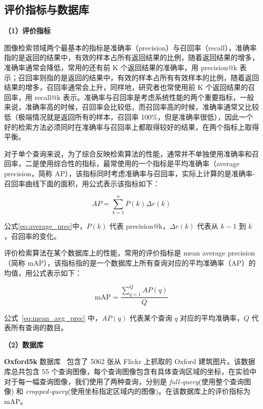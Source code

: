 \subsection{评价指标与数据库}

\noindent\textbf{（1）评价指标}

图像检索领域两个最基本的指标是准确率（precision）与召回率（recall），准确率指的是返回的结果中，有效的样本占所有返回结果的比例，随着返回结果的增多，准确率通常会降低，常用的还有前 K 个返回结果的准确率，用 precision@k 表示；召回率则指的是返回的结果中，有效的样本占所有有效样本的比例，随着返回结果的增多，召回率通常会上升，同样地，研究者也常使用前 K 个返回结果的召回率，用 recall@k 表示。准确率与召回率是考虑系统性能的两个重要指标，一般来说，准确率高的时候，召回率会比较低，而召回率高的时候，准确率通常又比较低（极端情况就是返回所有的样本，召回率 100\%，但是准确率很低），因此一个好的检索方法必须同时在准确率与召回率上都取得较好的结果，在两个指标上取得平衡。

对于单个查询来说，为了综合反映检索算法的性能，通常并不单独使用准确率和召回率，二是使用综合性的指标，最常使用的一个指标是平均准确率（average precision，简称 AP），该指标同时考虑准确率与召回率，实际上计算的是准确率-召回率曲线下面的面积，用公式表示该指标如下：

\begin{equation}\label{eq:average_prec}
AP = \sum_{k=1}^{n}P(k)\Delta r(k)
\end{equation}

公式\ref{eq:average_prec}中，$P(k)$ 代表 precision@k，$\Delta r(k)$ 代表从 $k-1$ 到 $k$，召回率的变化。

评价检索算法在某个数据库上的性能，常用的评价指标是 mean average precision（简称 mAP），该指标指的是一个数据库上所有查询对应的平均准确率（AP）的均值，用公式表示如下：

\begin{equation}\label{eq:mean_avg_prec}
\text{mAP} = \frac{\sum_{q=1}^{Q}AP(q)}{Q}
\end{equation}

公式~\ref{eq:mean_avg_prec} 中，$AP(q)$ 代表某个查询 $q$ 对应的平均准确率，$Q$ 代表所有查询的数目。

\noindent\textbf{（2）数据库}

\textbf{Oxford5k} 数据库~\cite{Philbin2007ObjectRW} 包含了 5062 张从 Flickr 上抓取的 Oxford 建筑图片。该数据库总共包含 55 个查询图像，每个查询图像包含有具体查询区域的坐标，在实验中对于每一幅查询图像，我们使用了两种查询，分别是 \emph{full-query}(使用整个查询图像) 和 \emph{cropped-query}(使用坐标指定区域内的图像)。在该数据库上的评价指标为 mAP。

